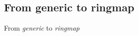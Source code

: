 \documentclass{beamer}
\begin{document}
\begin{frame}
\begin{columns}
\end{columns}
\end{frame}

\subsection*{From generic to ringmap}

\begin{frame}
	\begin{center}
		\huge{From \emph{generic} to \emph{ringmap}}
	\end{center}
\end{frame}
\end{document}
